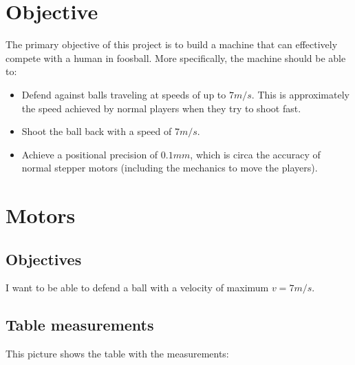 \section{Objective}\label{sec:objective}

The primary objective of this project is to build a machine that can effectively compete with a human in foosball.
More specifically, the machine should be able to:

\begin{itemize}
    \item Defend against balls traveling at speeds of up to $7m/s$.
    This is approximately the speed achieved by normal players when they try to shoot fast.
    \item Shoot the ball back with a speed of $7m/s$.
    \item Achieve a positional precision of $0.1mm$, which is circa the accuracy of normal stepper motors (including the mechanics to move the players).
\end{itemize}


\section{Motors}\label{sec:motors}

\subsection{Objectives}\label{subsec:objectives}
I want to be able to defend a ball with a velocity of maximum $v=7m/s$.

\subsection{Table measurements}\label{subsec:table_measurements}
This picture shows the table with the measurements:

